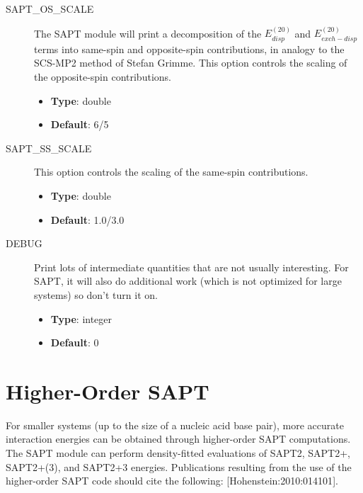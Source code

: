 \documentclass[letterpaper,10pt,english]{sphinxmanual}
\begin{document}
\begin{description}
\item[{SAPT\_OS\_SCALE}] \leavevmode{}\label{index:term-sapt-os-scale}
The SAPT module will print a decomposition of the $E_{disp}^{(20)}$
and $E_{exch-disp}^{(20)}$ terms into same-spin and opposite-spin
contributions, in analogy to the SCS-MP2 method of Stefan Grimme. This
option controls the scaling of the opposite-spin contributions.
\begin{itemize}
\item {} 
\textbf{Type}: double

\item {} 
\textbf{Default}: 6/5

\end{itemize}

\end{description}
\begin{description}
\item[{SAPT\_SS\_SCALE}] \leavevmode{}\label{index:term-sapt-ss-scale}
This option controls the scaling of the same-spin contributions.
\begin{itemize}
\item {} 
\textbf{Type}: double

\item {} 
\textbf{Default}: 1.0/3.0

\end{itemize}

\end{description}
\begin{description}
\item[{DEBUG}] \leavevmode{}\label{index:term-debug}
Print lots of intermediate quantities that are not usually interesting.
For SAPT, it will also do additional work (which is not optimized for
large systems) so don't turn it on.
\begin{itemize}
\item {} 
\textbf{Type}: integer

\item {} 
\textbf{Default}: 0

\end{itemize}

\end{description}


\section{Higher-Order SAPT}
\label{index:higher-order-sapt}
For smaller systems (up to the size of a nucleic acid base pair), more
accurate interaction energies can be obtained through higher-order SAPT
computations. The SAPT module can perform density-fitted evaluations
of SAPT2, SAPT2+, SAPT2+(3), and SAPT2+3 energies. Publications resulting
from the use of the higher-order SAPT code should cite the following:
{[}Hohenstein:2010:014101{]}.
\end{document}
